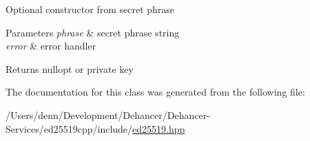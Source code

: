 Optional constructor from secret phrase 
\begin{DoxyParams}{Parameters}
{\em phrase} & secret phrase string \\
\hline
{\em error} & error handler \\
\hline
\end{DoxyParams}
\begin{DoxyReturn}{Returns}
nullopt or private key 
\end{DoxyReturn}


The documentation for this class was generated from the following file\+:\begin{DoxyCompactItemize}
\item 
/\+Users/denn/\+Development/\+Dehancer/\+Dehancer-\/\+Services/ed25519cpp/include/\mbox{\hyperlink{ed25519_8hpp}{ed25519.\+hpp}}\end{DoxyCompactItemize}
